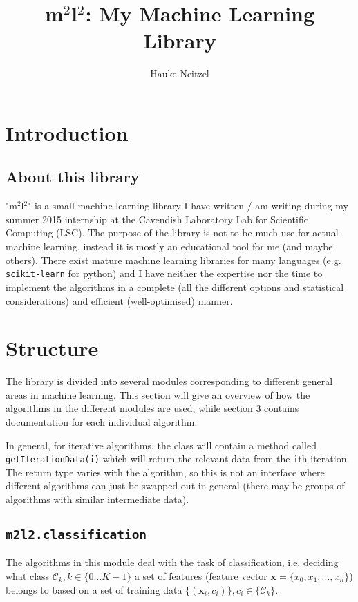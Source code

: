 \documentclass[a4paper, 12pt]{article}
\title{m$^2$l$^2$: My Machine Learning Library}
\author{Hauke Neitzel}
\begin{document}
\maketitle
\newpage

\section{Introduction}
\subsection{About this library}
"m$^2$l$^2$" is a small machine learning library I have written / am writing during my summer 2015 internship at the Cavendish Laboratory Lab for Scientific Computing (LSC). The purpose of the library is not to be much use for actual machine learning, instead it is mostly an educational tool for me (and maybe others). There exist mature machine learning libraries for many languages (e.g. \texttt{scikit-learn} for python) and I have neither the expertise nor the time to implement the algorithms in a complete (all the different options and statistical considerations) and efficient (well-optimised) manner.


\section{Structure}
The library is divided into several modules corresponding to different general areas in machine learning. This section will give an overview of how the algorithms in the different modules are used, while section 3 contains documentation for each individual algorithm.

In general, for iterative algorithms, the class will contain a method called \texttt{getIterationData(i)} which will return the relevant data from the \texttt{i}th iteration. The return type varies with the algorithm, so this is not an interface where different algorithms can just be swapped out in general (there may be groups of algorithms with similar intermediate data).

\subsection{\texttt{m2l2.classification}}
The algorithms in this module deal with the task of classification, i.e. deciding what class $\mathcal{C}_k, k \in \{0 \ldots K-1\}$ a set of features (feature vector $\mathbf{x} = \{x_0, x_1, \ldots, x_n\}$) belongs to based on a set of training data $\{(\mathbf{x}_i, c_i)\}, c_i \in \{\mathcal{C}_k\}$.
\end{document}
